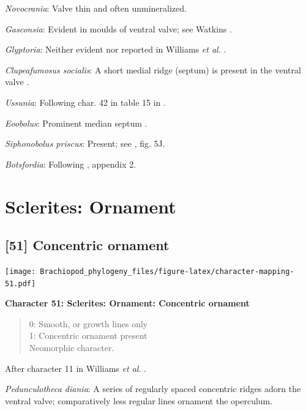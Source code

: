 \documentclass[openany]{book}
\theoremstyle{definition}
\theoremstyle{definition}
\theoremstyle{definition}
\theoremstyle{remark}
\begin{document}
\emph{Novocrania}: Valve thin and often unmineralized.

\emph{Gasconsia}: Evident in moulds of ventral valve; see Watkins
\citeyearpar{Watkins2002Newrecord}.

\emph{Glyptoria}: Neither evident nor reported in Williams \emph{et al}.
\citeyearpar{Williams2000BrachiopodaLinguliformea}.

\emph{Clupeafumosus socialis}: A short medial ridge (septum) is present
in the ventral valve \citep{Topper2013Reappraisalof}.

\emph{Ussunia}: Following char. 42 in table 15 in
\citet{Williams2000BrachiopodaLinguliformea}.

\emph{Eoobolus}: Prominent median septum \citep[fig. 4d, e
in][]{Balthasar2009Thebrachiopod}.

\emph{Siphonobolus priscus}: Present; see
\citet{Popov2009Earlyontogeny}, fig. 5J.

\emph{Botsfordia}: Following \citet{Williams1998Thediversity}, appendix
2.

\hypertarget{sclerites-ornament}{%
\section{Sclerites: Ornament}\label{sclerites-ornament}}

\hypertarget{concentric-ornament}{%
\subsection*{{[}51{]} Concentric ornament}\label{concentric-ornament}}

\texttt{[image: Brachiopod\_phylogeny\_files/figure-latex/character-mapping-51.pdf]}

\textbf{Character 51: Sclerites: Ornament: Concentric ornament}

\begin{quote}
0: Smooth, or growth lines only\\
1: Concentric ornament present\\
Neomorphic character.
\end{quote}

After character 11 in Williams \emph{et al}.
\citeyearpar{Williams1998Thediversity}.

\emph{Pedunculotheca diania}: A series of regularly spaced concentric
ridges adorn the ventral valve; comparatively less regular lines
ornament the operculum.
\end{document}
